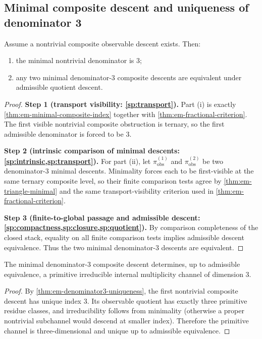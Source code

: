 \subsection{Minimal composite descent and uniqueness of denominator 3}
\label{sec:denom3-unique}
\begin{theorem}
\label{thm:em-denominator3-uniqueness}
Assume a nontrivial composite observable descent exists.
Then:
\begin{enumerate}[label=\textup{(\roman*)}]
\item the minimal nontrivial denominator is \(3\);
\item any two minimal denominator-\(3\) composite descents are equivalent
      under admissible quotient descent.
\end{enumerate}
\end{theorem}
\begin{proof}
\textbf{Step 1 (transport visibility: \cref{sp:transport}).}
Part \textup{(i)} is exactly
\cref{thm:em-minimal-composite-index} together with
\cref{thm:em-fractional-criterion}.
The first visible nontrivial composite obstruction is ternary, so the
first admissible denominator is forced to be \(3\).

\textbf{Step 2 (intrinsic comparison of minimal descents:
\cref{sp:intrinsic,sp:transport}).}
For part \textup{(ii)}, let
\(\pi_{\mathrm{obs}}^{(1)}\) and \(\pi_{\mathrm{obs}}^{(2)}\)
be two denominator-\(3\) minimal descents.
Minimality forces each to be first-visible at the same ternary composite
level, so their finite comparison tests agree by
\cref{thm:em-triangle-minimal} and the same transport-visibility
criterion used in \cref{thm:em-fractional-criterion}.

\textbf{Step 3 (finite-to-global passage and admissible descent:
\cref{sp:compactness,sp:closure,sp:quotient}).}
By comparison completeness of the closed stack, equality on all finite
comparison tests implies admissible descent equivalence.
Thus the two minimal denominator-\(3\) descents are equivalent.
\end{proof}
\begin{corollary}
\label{cor:em-primitive-triplet}
The minimal denominator-\(3\) composite descent determines, up to
admissible equivalence, a primitive irreducible internal multiplicity
channel of dimension \(3\).
\end{corollary}
\begin{proof}
By \cref{thm:em-denominator3-uniqueness}, the first nontrivial composite
descent has unique index \(3\).
Its observable quotient has exactly three primitive residue classes, and
irreducibility follows from minimality (otherwise a proper nontrivial
subchannel would descend at smaller index).
Therefore the primitive channel is three-dimensional and unique up to
admissible equivalence.
\end{proof}
